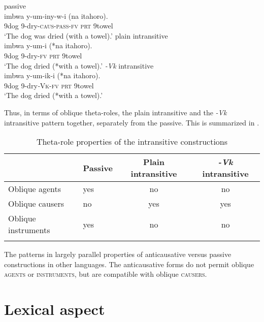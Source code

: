 \documentclass[output=paper]{langsci/lanmgscibook}
\begin{document}
\ea\label{ex:gluckman:9}
  \ea \label{ex:gluckman:9a} 
  {{passive}}\\
  \gll imbwa y-um-iny-w-i            (na    itahoro).\\
      9dog 9-dry-\textsc{caus}-\textsc{pass}-\textsc{fv}   \textsc{prt}  9towel\\
  \glt ‘The dog was dried (with a towel).’
  \ex\label{ex:gluckman:9b} 
  {{plain intransitive}}\\
  \gll imbwa y-um-i          (*na   itahoro).\\
      9dog   9-dry-\textsc{fv}         \hphantom{(*}\textsc{prt} 9towel\\
  \glt ‘The dog dried (*with a towel).’
  \ex\label{ex:gluckman:9c}
  {{\textit{-Vk}}{ intransitive}}\\
  \gll imbwa  y-um-ik-i      (*na  itahoro).\\
      9dog    9-dry\textit{-}\textsc{Vk}-\textsc{fv} \hphantom{(*}\textsc{prt} 9towel\\
  \glt ‘The dog dried (*with a towel).’
  \z
\z

Thus, in terms of oblique theta-roles, the plain intransitive and the \textit{-Vk} intransitive pattern together, separately from the  passive. This is summarized in .

\begin{table}
\caption{Theta-role properties of the intransitive constructions}
\label{tab:gluckman:2}

\begin{tabularx}{\textwidth}{llCC}
\lsptoprule
 & {Passive} & {Plain intransitive} & {\textit{-Vk}} {intransitive}\\
\midrule
{Oblique agents} & yes & no & no\\
{Oblique causers} & no & yes & yes\\
{Oblique instruments} & yes & no & no\\
\lspbottomrule
\end{tabularx}
\end{table}

The  patterns in  largely parallel properties of anticausative versus passive constructions in other languages. The anticausative forms do not permit oblique \textsc{agents} or \textsc{instruments}, but are compatible with oblique \textsc{causers.}

\section{Lexical aspect}\label{sec:gluckman:4}
\end{document}
